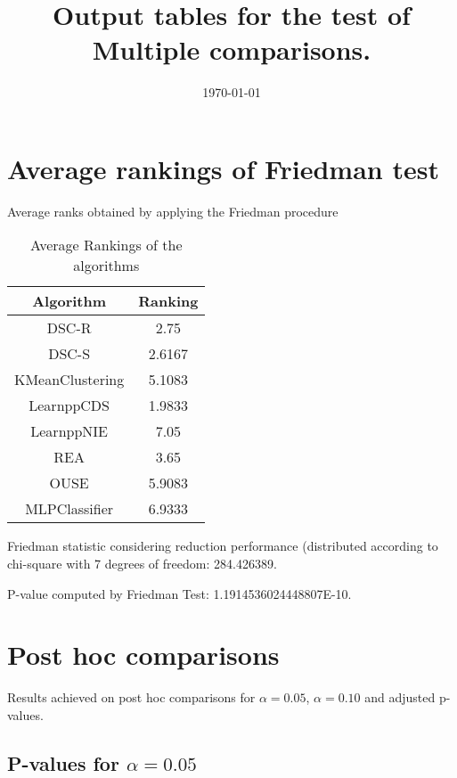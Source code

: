 \documentclass[a4paper,10pt]{article}
\title{Output tables for the test of Multiple comparisons.}
\author{}
\date{\today}
\begin{document}
\begin{landscape}
\pagestyle{empty}
\maketitle
\thispagestyle{empty}
\section{Average rankings of Friedman test}



Average ranks obtained by applying the Friedman procedure

\begin{table}[!htp]
\centering
\begin{tabular}{|c|c|}\hline
Algorithm&Ranking\\\hline
DSC-R & 2.75\\
DSC-S & 2.6167\\
KMeanClustering & 5.1083\\
LearnppCDS & 1.9833\\
LearnppNIE & 7.05\\
REA & 3.65\\
OUSE & 5.9083\\
MLPClassifier & 6.9333\\
\hline
\end{tabular}
\caption{Average Rankings of the algorithms}
\end{table}

Friedman statistic considering reduction performance (distributed according to chi-square with 7 degrees of freedom: 284.426389.

P-value computed by Friedman Test: 1.1914536024448807E-10.\newline



\pagebreak

\section{Post hoc comparisons}

Results achieved on post hoc comparisons for $\alpha = 0.05$, $\alpha = 0.10$ and adjusted p-values.

\subsection{P-values for $\alpha=0.05$}


\end{landscape}
\end{document}
